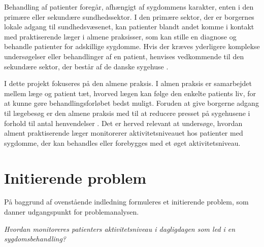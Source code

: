 Behandling af patienter foregår, afhængigt af sygdommens karakter, enten i den primære eller sekundære sundhedssektor. I den primære sektor, der er borgernes lokale adgang til sundhedsvæsenet, kan patienter blandt andet komme i kontakt med praktiserende læger i almene praksisser, som kan stille en diagnose og behandle patienter for adskillige sygdomme. Hvis der kræves yderligere komplekse undersøgelser eller behandlinger af en patient, henvises vedkommende til den sekundære sektor, der består af de danske sygehuse \citep{vedsted2014}. 

I dette projekt fokuseres på den almene praksis. I almen praksis er samarbejdet mellem læge og patient tæt, hvorved lægen kan følge den enkelte patients liv, for at kunne gøre behandlingsforløbet bedst muligt. Foruden at give borgerne adgang til lægebesøg er den almene praksis med til at reducere presset på sygehusene i forhold til antal henvendelser \citep{vedsted2014}.
\newpage
Det er herved relevant at undersøge, hvordan alment praktiserende læger monitorerer aktivitetsniveauet hos patienter med sygdomme, der kan behandles eller forebygges med et øget aktivitetsniveau.  


\section{Initierende problem}
På baggrund af ovenstående indledning formuleres et initierende problem, som danner udgangspunkt for problemanalysen. 

\begin{center}
\textit{Hvordan monitoreres patienters aktivitetsniveau i dagligdagen som led i en sygdomsbehandling?}
\end{center}


